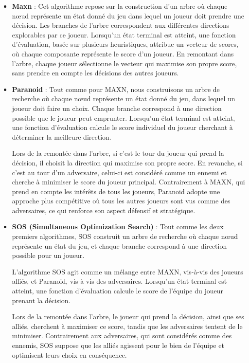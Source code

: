 \documentclass[a4paper,12pt]{article}
\begin{document}
\begin{itemize}
   \item \textbf{Maxn} :
    Cet algorithme repose sur la construction d’un arbre où chaque nœud représente un état donné du jeu dans lequel un joueur doit prendre une décision. Les branches de l’arbre correspondent aux différentes directions explorables par ce joueur. Lorsqu’un état terminal est atteint, une fonction d’évaluation, basée sur plusieurs heuristiques, attribue un vecteur de scores, où chaque composante représente le score d’un joueur. En remontant dans l’arbre, chaque joueur sélectionne le vecteur qui maximise son propre score, sans prendre en compte les décisions des autres joueurs.
    
    \item \textbf{Paranoid} :  
    Tout comme pour MAXN, nous construisons un arbre de recherche où chaque nœud représente un état donné du jeu, dans lequel un joueur doit faire un choix. Chaque branche correspond à une direction possible que le joueur peut emprunter. Lorsqu’un état terminal est atteint, une fonction d’évaluation calcule le score individuel du joueur cherchant à déterminer la meilleure direction.  

    Lors de la remontée dans l’arbre, si c'est le tour du joueur qui prend la décision, il choisit la direction qui maximise son propre score. En revanche, si c'est au tour d'un adversaire, celui-ci est considéré comme un ennemi et cherche à minimiser le score du joueur principal. Contrairement à MAXN, qui prend en compte les intérêts de tous les joueurs, Paranoid adopte une approche plus compétitive où tous les autres joueurs sont vus comme des adversaires, ce qui renforce son aspect défensif et stratégique.

    
    \item \textbf{SOS (Simultaneous Optimization Search)} :  
    Tout comme les deux premiers algorithmes, SOS construit un arbre de recherche où chaque nœud représente un état du jeu, et chaque branche correspond à une direction possible pour un joueur.  

    L’algorithme SOS agit comme un mélange entre MAXN, vis-à-vis des joueurs alliés, et Paranoid, vis-à-vis des adversaires. Lorsqu’un état terminal est atteint, une fonction d’évaluation calcule le score de l’équipe du joueur prenant la décision.  

    Lors de la remontée dans l’arbre, le joueur qui prend la décision, ainsi que ses alliés, cherchent à maximiser ce score, tandis que les adversaires tentent de le minimiser. Contrairement aux adversaires, qui sont considérés comme des ennemis, SOS suppose que les alliés agissent pour le bien de l’équipe et optimisent leurs choix en conséquence.

\end{itemize}
\end{document}

